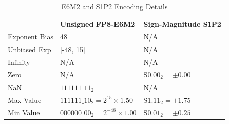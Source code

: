 \begin{table}[tbp]
  \caption{E6M2 and S1P2 Encoding Details}
  \label{E6M2-S1P2}
  \centering
  \begin{tabular}{lll}
    \toprule 
     & Unsigned FP8-E6M2 & Sign-Magnitude S1P2\\
    \midrule
    Exponent Bias     & 48                                   & N/A    \\
    Unbiased Exp      & [-48, 15]                            & N/A    \\
    Infinity          & N/A                                  & N/A    \\
    Zero              & N/A                                  & S$0.00_2 = \pm 0.00$ \\
    NaN               & $111111\_ 11_2$                      & N/A    \\
    Max Value         & $111111\_10_2 = 2^{15} \times 1.50$  & S$1.11_2 = \pm 1.75$ \\
    Min Value         & $000000\_00_2 = 2^{-48} \times 1.00$ & S$0.01_2 = \pm 0.25$ \\
    \bottomrule
  \end{tabular}
\end{table}